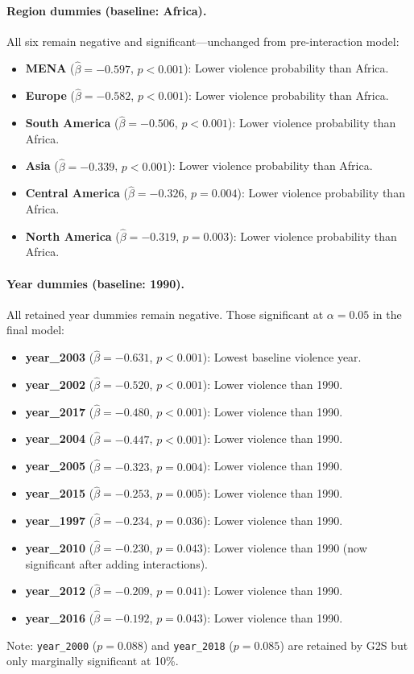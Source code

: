 \documentclass[12pt,a4paper]{article}
\begin{document}
\paragraph{Region dummies (baseline: Africa).}
All six remain negative and significant---unchanged from pre-interaction model:
\begin{itemize}
  \item \textbf{MENA} ($\hat{\beta} = -0.597$, $p < 0.001$): Lower violence probability than Africa.
  \item \textbf{Europe} ($\hat{\beta} = -0.582$, $p < 0.001$): Lower violence probability than Africa.
  \item \textbf{South America} ($\hat{\beta} = -0.506$, $p < 0.001$): Lower violence probability than Africa.
  \item \textbf{Asia} ($\hat{\beta} = -0.339$, $p < 0.001$): Lower violence probability than Africa.
  \item \textbf{Central America} ($\hat{\beta} = -0.326$, $p = 0.004$): Lower violence probability than Africa.
  \item \textbf{North America} ($\hat{\beta} = -0.319$, $p = 0.003$): Lower violence probability than Africa.
\end{itemize}

\paragraph{Year dummies (baseline: 1990).}
All retained year dummies remain negative. Those significant at $\alpha = 0.05$ in the final model:
\begin{itemize}
  \item \textbf{year\_2003} ($\hat{\beta} = -0.631$, $p < 0.001$): Lowest baseline violence year.
  \item \textbf{year\_2002} ($\hat{\beta} = -0.520$, $p < 0.001$): Lower violence than 1990.
  \item \textbf{year\_2017} ($\hat{\beta} = -0.480$, $p < 0.001$): Lower violence than 1990.
  \item \textbf{year\_2004} ($\hat{\beta} = -0.447$, $p < 0.001$): Lower violence than 1990.
  \item \textbf{year\_2005} ($\hat{\beta} = -0.323$, $p = 0.004$): Lower violence than 1990.
  \item \textbf{year\_2015} ($\hat{\beta} = -0.253$, $p = 0.005$): Lower violence than 1990.
  \item \textbf{year\_1997} ($\hat{\beta} = -0.234$, $p = 0.036$): Lower violence than 1990.
  \item \textbf{year\_2010} ($\hat{\beta} = -0.230$, $p = 0.043$): Lower violence than 1990 (now significant after adding interactions).
  \item \textbf{year\_2012} ($\hat{\beta} = -0.209$, $p = 0.041$): Lower violence than 1990.
  \item \textbf{year\_2016} ($\hat{\beta} = -0.192$, $p = 0.043$): Lower violence than 1990.
\end{itemize}
Note: \texttt{year\_2000} ($p = 0.088$) and \texttt{year\_2018} ($p = 0.085$) are retained by G2S but only marginally significant at 10\%.
\end{document}

